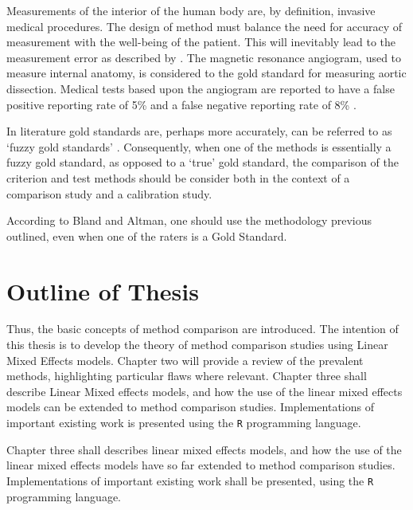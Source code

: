 \documentclass[12pt, a4paper]{report}
\theoremstyle{plain}
\theoremstyle{definition}
\theoremstyle{remark}
\begin{document}
	Measurements of the interior of the human body are, by definition,
	invasive medical procedures. The design of method must balance the
	need for accuracy of measurement with the well-being of the
	patient. This will inevitably lead to the measurement error as
	described by \citet{DunnSEME}. The magnetic resonance angiogram,
	used to measure internal anatomy, is considered to the gold
	standard for measuring aortic dissection. Medical tests based upon
	the angiogram are reported to have a false positive reporting rate
	of 5\% and a false negative reporting rate of 8\% \citep{ACR}.
	
	In literature gold standards are, perhaps more accurately, can be referred to as
	`fuzzy gold standards' \citep{phelps}. Consequently, when one of the methods is
	essentially a fuzzy gold standard, as opposed to a `true' gold
	standard, the comparison of the criterion and test methods should
	be consider both in the context of a comparison study and a
	calibration study.
	
	
	
	
	According to Bland and Altman, one should use the methodology
	previous outlined, even when one of the raters is a Gold Standard.
	
	
	
	
	
	
	
	
	\section{Outline of Thesis}
	Thus, the basic concepts of method comparison are introduced. The intention of this thesis is to develop the theory of method comparison studies using Linear Mixed Effects models. Chapter two will provide a review of the prevalent methods, highlighting particular flaws where relevant. Chapter three shall describe Linear Mixed effects models, and how the use of the linear mixed
	effects models can be extended to method comparison studies. Implementations of important existing work is presented using the \texttt{R} programming language.
	
	
	
	Chapter three shall describes linear mixed effects models, and how the use of the linear mixed effects models have so far extended to method comparison studies. Implementations of important existing work shall be presented, using the \texttt{R} programming language.
	
\end{document}
